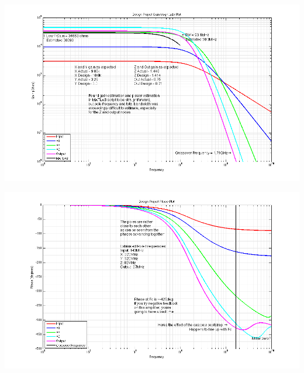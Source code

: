 \documentclass[12pt,a4paper]{article}
\begin{document}
{\centering
	\includegraphics[width=1.1\textwidth]{mag.png}
\par}

{\centering
	\includegraphics[width=1.1\textwidth]{phase.png}
\par}

\pagebreak


\end{document}
